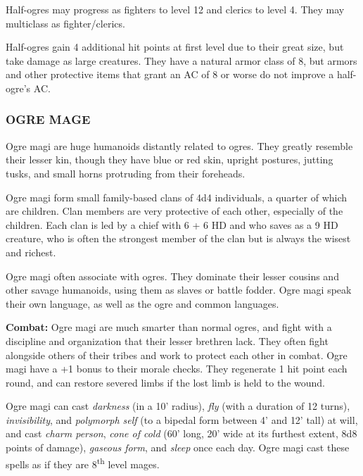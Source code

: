 \begin{multicols}{2}
\begin{minipage}{\columnwidth}
\end{minipage}

Half-ogres may progress as fighters to level 12 and clerics to level 4. They may multiclass as fighter/clerics.

Half-ogres gain 4 additional hit points at first level due to their great size, but take damage as large creatures. They have a natural armor class of 8, but armors and other protective items that grant an AC of 8 or worse do not improve a half-ogre's AC.

\subsubsection{OGRE MAGE}

Ogre magi are huge humanoids distantly related to ogres. They greatly resemble their lesser kin, though they have blue or red skin, upright postures, jutting tusks, and small horns protruding from their foreheads. 

Ogre magi form small family-based clans of 4d4 individuals, a quarter of which are children. Clan members are very protective of each other, especially of the children. Each clan is led by a chief with 6 + 6 HD and who saves as a 9 HD creature, who is often the strongest member of the clan but is always the wisest and richest. 

Ogre magi often associate with ogres. They dominate their lesser cousins and other savage humanoids, using them as slaves or battle fodder. Ogre magi speak their own language, as well as the ogre and common languages. 

\textbf{Combat:} Ogre magi are much smarter than normal ogres, and fight with a discipline and organization that their lesser brethren lack. They often fight alongside others of their tribes and work to protect each other in combat. Ogre magi have a +1 bonus to their morale checks. They regenerate 1 hit point each round, and can restore severed limbs if the lost limb is held to the wound.

Ogre magi can cast \textit{darkness} (in a 10' radius), \textit{fly} (with a duration of 12 turns), \textit{invisibility}, and \textit{polymorph self} (to a bipedal form between 4' and 12' tall) at will, and cast  \textit{charm person}, \textit{cone of cold} (60' long, 20' wide at its furthest extent, 8d8 points of damage), \textit{gaseous form}, and \textit{sleep} once each day. Ogre magi cast these spells as if they are 8\textsuperscript{th} level mages.


\end{multicols}
